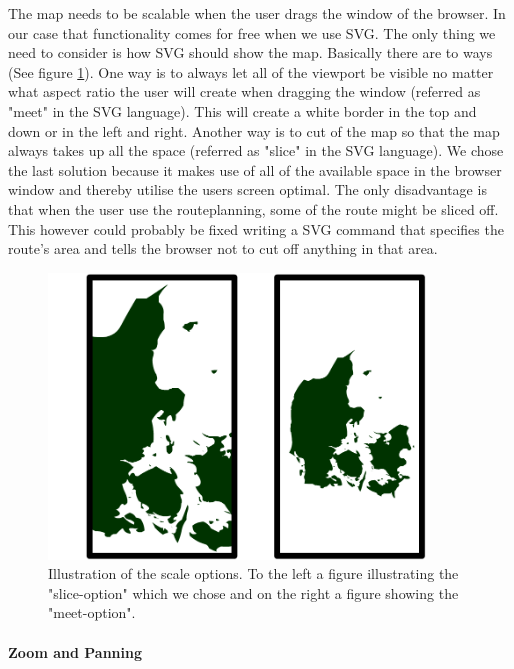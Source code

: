 \documentclass[a4paper,10pt,titlepage]{article}
\begin{document}
The map needs to be scalable when the user drags the window of the browser. In our case that functionality comes for free when we use SVG. The only thing we need to consider is how SVG should show the map. Basically there are to ways (See figure \ref{fig:mapSliceMeet}). One way is to always let all of the viewport be visible no matter what aspect ratio the user will create when dragging the window (referred as "meet" in the SVG language). This will create a white border in the top and down or in the left and right. Another way is to cut of the map so that the map always takes up all the space (referred as "slice" in the SVG language). We chose the last solution because it makes use of all of the available space in the browser window and thereby utilise the users screen optimal. The only disadvantage is that when the user use the routeplanning, some of the route might be sliced off. This however could probably be fixed writing a SVG command that specifies the route's area and tells the browser not to cut off anything in that area.
\begin{figure}[H]
\includegraphics[width=100mm]{mapSliceMeet.png}
\caption{Illustration of the scale options. To the left a figure illustrating the "slice-option" which we chose and on the right a figure showing the "meet-option".}
\label{fig:mapSliceMeet}
\end{figure}


\paragraph{Zoom and Panning}\mbox{}\
\end{document}
